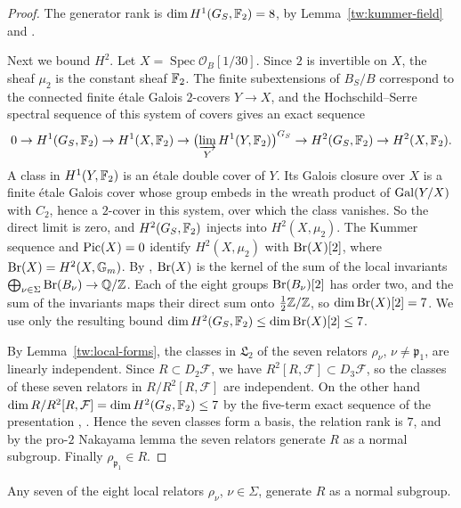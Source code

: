 \begin{proof}
The generator rank is $\dim H^1(G_S,\mathbb F_2)=8$, by
Lemma~\ref{tw:kummer-field} and
\cite[Proposition~3.9.1]{NeukirchSchmidtWingberg2008}.

Next we bound $H^2$. Let $X=\operatorname{Spec}\mathcal O_B[1/30]$. Since
$2$ is invertible on $X$, the sheaf $\mu_2$ is the constant sheaf $\mathbb F_2$.
The finite subextensions of $B_S/B$ correspond to the connected finite étale
Galois $2$-covers $Y\to X$, and the Hochschild--Serre spectral sequence of
this system of covers \cite[Theorem~14.9 and Remark~14.10]{MilneEtale} gives an exact
sequence
\[
 0\to H^1(G_S,\mathbb F_2)\to H^1(X,\mathbb F_2)\to
 \bigl(\varinjlim_Y H^1(Y,\mathbb F_2)\bigr)^{G_S}\to
 H^2(G_S,\mathbb F_2)\to H^2(X,\mathbb F_2).
\]
A class in $H^1(Y,\mathbb F_2)$ is an étale double cover of $Y$. Its Galois closure
over $X$ is a finite étale Galois cover whose group embeds in the wreath
product of $\operatorname{Gal}(Y/X)$ with $C_2$, hence a $2$-cover in this system, over which
the class vanishes. So the direct limit is zero, and
$H^2(G_S,\mathbb F_2)$ injects into $H^2(X,\mu_2)$. The Kummer sequence and
$\operatorname{Pic}(X)=0$ identify $H^2(X,\mu_2)$ with $\operatorname{Br}(X)[2]$, where
$\operatorname{Br}(X)=H^2(X,\mathbb G_m)$. By \cite[Theorem~6.8.3 and
Example~6.9.4]{Poonen}, $\operatorname{Br}(X)$ is the kernel of the sum of the local
invariants $\bigoplus_{\nu\in\Sigma}\operatorname{Br}(B_\nu)\to\mathbb Q/\mathbb Z$. Each of the eight
groups $\operatorname{Br}(B_\nu)[2]$ has order two, and the sum of the invariants maps their
direct sum onto $\frac12\mathbb Z/\mathbb Z$, so $\dim\operatorname{Br}(X)[2]=7$. We use only the
resulting bound $\dim H^2(G_S,\mathbb F_2)\le\dim\operatorname{Br}(X)[2]\le7$.

By Lemma~\ref{tw:local-forms}, the classes in $\mathfrak L_2$ of the seven
relators $\rho_\nu$, $\nu\ne\mathfrak p_1$, are linearly independent. Since
$R\subset D_2\mathcal F$, we have $R^2[R,\mathcal F]\subset D_3\mathcal F$, so
the classes of these seven relators in $R/R^2[R,\mathcal F]$ are independent.
On the other hand
$\dim R/R^2[R,\mathcal F]=\dim H^2(G_S,\mathbb F_2)\le7$ by the five-term
exact sequence of the presentation
\cite[Proposition~3.9.5]{NeukirchSchmidtWingberg2008},
\cite[(3.3)--(3.4)]{Quadrelli2021}. Hence the seven classes form a basis, the
relation rank is $7$, and by the pro-$2$ Nakayama lemma
\cite[Corollary~3.9.3]{NeukirchSchmidtWingberg2008} the seven relators
generate $R$ as a normal subgroup. Finally $\rho_{\mathfrak p_1}\in R$.
\end{proof}

\begin{corollary}\label{tw:any-seven}
Any seven of the eight local relators $\rho_\nu$, $\nu\in\Sigma$, generate
$R$ as a normal subgroup.
\end{corollary}

